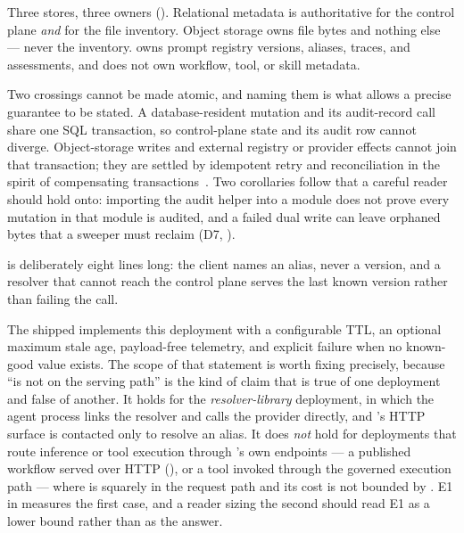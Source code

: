 


Three stores, three owners (). Relational metadata is
authoritative for the control plane \emph{and} for the file inventory. Object
storage owns file bytes and nothing else --- never the inventory. \mlflow{} owns
prompt registry versions, aliases, traces, and assessments, and does not own
workflow, tool, or skill metadata.

Two crossings cannot be made atomic, and naming them is what allows a precise
guarantee to be stated. A database-resident mutation and its audit-record call
share one SQL transaction, so control-plane state and its audit row cannot diverge.
Object-storage writes and external registry or provider effects cannot join that
transaction; they are settled by idempotent retry and reconciliation in the spirit
of compensating transactions~\cite{garciamolina1987sagas,helland2007apostates}.
Two corollaries follow that a careful reader should hold onto: importing the audit
helper into a module does not prove every mutation in that module is audited, and
a failed dual write can leave orphaned bytes that a sweeper must reclaim (D7,
).

  is deliberately eight lines long: the
client names an alias, never a version, and a resolver that cannot reach the
control plane serves the last known version rather than failing the call.

The shipped  implements this deployment
with a configurable TTL, an optional maximum stale age, payload-free telemetry,
and explicit failure when no known-good value exists. The scope of that statement
is worth fixing precisely, because ``\sys is not on
the serving path'' is the kind of claim that is true of one deployment and false of
another. It holds for the \emph{resolver-library} deployment, in which the agent
process links the resolver and calls the provider directly, and \sys's HTTP surface
is contacted only to resolve an alias. It does \emph{not} hold for deployments that
route inference or tool execution through \sys's own endpoints --- a published
workflow served over HTTP (), or a tool invoked through
the governed execution path --- where \sys is squarely in the request path and its
cost is not bounded by . E1 in  measures the
first case, and a reader sizing the second should read E1 as a lower bound rather
than as the answer.

